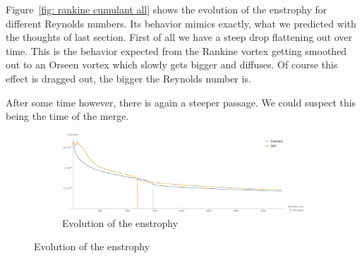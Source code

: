 Figure~\ref{fig: rankine cumulant all} shows the evolution of the enstrophy for different Reynolds numbers.
Its behavior mimics exactly, what we predicted with the thoughts of last section.
First of all we have a steep drop flattening out over time.
This is the behavior expected from the Rankine vortex getting smoothed out to an Orseen vortex which slowly gets bigger and diffuses.
Of course this effect is dragged out, the bigger the Reynolds number is.

After some time however, there is again a steeper passage.
We could suspect this being the time of the merge.

\begin{figure}
  \centering
  \begin{subfigure}[b]{\textwidth}
    \centering
    \includegraphics[width=\textwidth]{../figures/vortexMerge_enstrophy.pdf}  %
    \caption{Evolution of the enstrophy}
\label{fig: rankine result}
  \end{subfigure}%


\end{figure}
